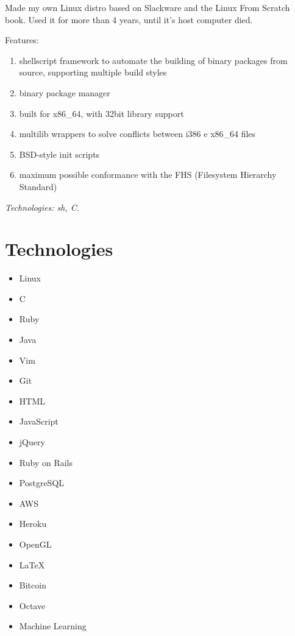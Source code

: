 \documentclass[a4paper]{simplecv}
\begin{document}
\begin{topic}
	Made my own Linux distro based on Slackware and the Linux From Scratch
	book. Used it for more than 4 years, until it's host computer died.

	Features:

	\begin{enumerate}
		\item shellscript framework to automate the building of binary
			packages from source, supporting multiple build styles

		\item binary package manager

		\item built for x86\_64, with 32bit library support

		\item multilib wrappers to solve conflicts between i386 e
			x86\_64 files

		\item BSD-style init scripts

		\item maximum possible conformance with the FHS (Filesystem
			Hierarchy Standard)
	\end{enumerate}

	{\em\scriptsize Technologies: sh, C.}

\end{topic}

\section{Technologies}

\begin{multicols}{3}
	\raggedcolumns
	\begin{itemize}
		\item Linux
		\item C
		\item Ruby
		\item Java
		\item Vim
		\item Git
		\item HTML
		\item JavaScript
		\item jQuery
		\item Ruby on Rails
		\item PostgreSQL
		\item AWS
		\item Heroku
		\item OpenGL
		\item \LaTeX{}
		\item Bitcoin
		\item Octave
		\item Machine Learning
	\end{itemize}
\end{multicols}
\end{document}

